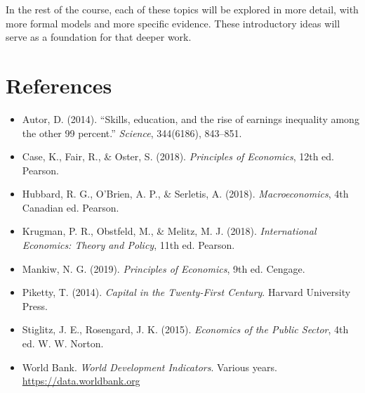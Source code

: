 \documentclass[12pt]{article}
\begin{document}
In the rest of the course, each of these topics will be explored in more detail, with more formal models and more specific evidence. These introductory ideas will serve as a foundation for that deeper work.

\vfill
\newpage

\section*{References}

\begin{itemize}[leftmargin=1.5em]

    \item Autor, D. (2014). ``Skills, education, and the rise of earnings inequality among the other 99 percent.'' \emph{Science}, 344(6186), 843--851.

    \item Case, K., Fair, R., \& Oster, S. (2018). \emph{Principles of Economics}, 12th ed. Pearson.

    \item Hubbard, R. G., O'Brien, A. P., \& Serletis, A. (2018). \emph{Macroeconomics}, 4th Canadian ed. Pearson.

    \item Krugman, P. R., Obstfeld, M., \& Melitz, M. J. (2018). \emph{International Economics: Theory and Policy}, 11th ed. Pearson.

    \item Mankiw, N. G. (2019). \emph{Principles of Economics}, 9th ed. Cengage.

    \item Piketty, T. (2014). \emph{Capital in the Twenty-First Century}. Harvard University Press.

    \item Stiglitz, J. E., Rosengard, J. K. (2015). \emph{Economics of the Public Sector}, 4th ed. W. W. Norton.

    \item World Bank. \emph{World Development Indicators}. Various years. \url{https://data.worldbank.org}
\end{itemize}
\end{document}
